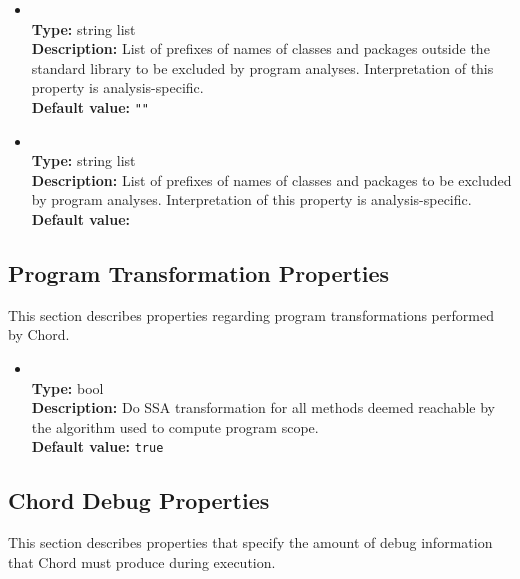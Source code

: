 \begin{itemize}
\item
{} \\
{\bf Type:} string list \\
{\bf Description:} List of prefixes of names of classes and packages outside the standard library to be excluded by program analyses.  Interpretation of this property is analysis-specific. \\
{\bf Default value:} {\tt ""}

\item
{} \\
{\bf Type:} string list \\
{\bf Description:} List of prefixes of names of classes and packages to be excluded by program analyses.  Interpretation of this property is analysis-specific. \\
{\bf Default value:} 
\end{itemize}

\subsection{Program Transformation Properties}

This section describes properties regarding program transformations performed by Chord.

\begin{itemize}
\item
{} \\
{\bf Type:} bool \\
{\bf Description:} Do SSA transformation for all methods deemed reachable by the algorithm used to compute program scope. \\
{\bf Default value:} {\tt true} 
\end{itemize}

\subsection{Chord Debug Properties}

This section describes properties that specify the amount of debug information that Chord must produce during execution.

